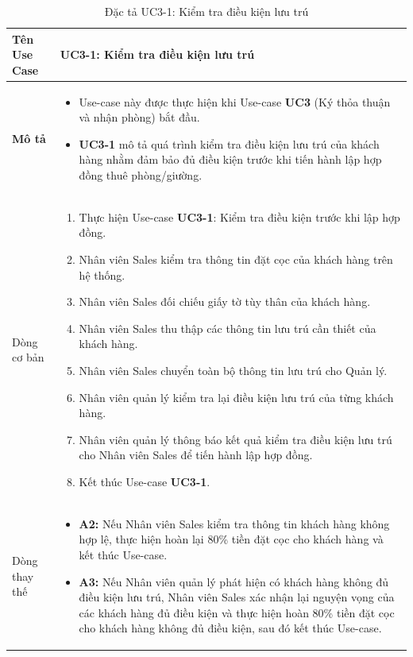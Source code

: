 \noindent
\begin{table}[H]
    \centering
\begin{tabularx}{\textwidth}{|>{\centering\arraybackslash\bfseries}m{3.5cm}|X|}
    \hline
    Tên Use Case & {\centering\textbf{UC3-1: Kiểm tra điều kiện lưu trú}\par} \\ 
    \hline

    Mô tả &
    \vspace{0.2cm}
    \begin{itemize}[leftmargin=*, nosep, label=-]
        \item Use-case này được thực hiện khi Use-case \textbf{UC3} (Ký thỏa thuận và nhận phòng) bắt đầu.
        \item \textbf{UC3-1} mô tả quá trình kiểm tra điều kiện lưu trú của khách hàng nhằm đảm bảo đủ điều kiện trước khi tiến hành lập hợp đồng thuê phòng/giường.
    \end{itemize} \\ 
    \hline

    Dòng cơ bản &
    \vspace{0.2cm}
    \begin{enumerate}[leftmargin=*, nosep]
        \item Thực hiện Use-case \textbf{UC3-1}: Kiểm tra điều kiện trước khi lập hợp đồng.
        \item Nhân viên Sales kiểm tra thông tin đặt cọc của khách hàng trên hệ thống.
        \item Nhân viên Sales đối chiếu giấy tờ tùy thân của khách hàng.
        \item Nhân viên Sales thu thập các thông tin lưu trú cần thiết của khách hàng.
        \item Nhân viên Sales chuyển toàn bộ thông tin lưu trú cho Quản lý.
        \item Nhân viên quản lý kiểm tra lại điều kiện lưu trú của từng khách hàng.
        \item Nhân viên quản lý thông báo kết quả kiểm tra điều kiện lưu trú cho Nhân viên Sales để tiến hành lập hợp đồng.
        \item Kết thúc Use-case \textbf{UC3-1}.
    \end{enumerate} \\ 
    \hline

    Dòng thay thế &
    \vspace{0.2cm}
    \begin{itemize}[leftmargin=*, nosep, label=-]
        \item \textbf{A2:} Nếu Nhân viên Sales kiểm tra thông tin khách hàng không hợp lệ, thực hiện hoàn lại 80\% tiền đặt cọc cho khách hàng và kết thúc Use-case.
        \item \textbf{A3:} Nếu Nhân viên quản lý phát hiện có khách hàng không đủ điều kiện lưu trú, Nhân viên Sales xác nhận lại nguyện vọng của các khách hàng đủ điều kiện và thực hiện hoàn 80\% tiền đặt cọc cho khách hàng không đủ điều kiện, sau đó kết thúc Use-case.
    \end{itemize} \\ 
    \hline
\end{tabularx}
\caption{Đặc tả UC3-1: Kiểm tra điều kiện lưu trú}
\end{table}


